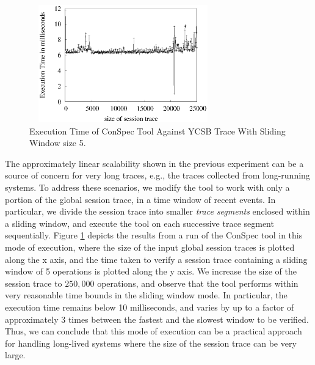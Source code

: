 \documentclass[journal, compsoc]{IEEEtran}
\begin{document}
\begin{figure}%
	\includegraphics[width=3.2in,height=2in]
	{conspecExecutionTimes.eps} %
	\caption{Execution Time of ConSpec Tool Against YCSB Trace With Sliding Window size 5.}
	\label{fig:exampleIter}
\end{figure}
	
	 \par The approximately linear scalability shown in the previous experiment can be a source of concern for very long traces, e.g., the traces collected from long-running systems. To address these scenarios, we modify the tool to work with only a portion of the global session trace, in a time window of recent events. In particular, we divide the session trace into smaller \emph{trace segments} enclosed within a sliding window, and execute  the tool on  each successive trace segment sequentially.   Figure \ref{fig:exampleIter} depicts the results from a run of the ConSpec tool in this mode of execution, where the size of the input global session traces is plotted along the x axis, and the time taken to verify a session trace containing a sliding window of 5 operations is plotted along the y axis. We increase the size of the session trace to $250,000$ operations, and observe that the tool performs within very reasonable time bounds in the sliding window mode. In particular, the execution time remains below %
	   10 milliseconds, and varies by up to a factor of approximately 3 times between the fastest and the slowest window to be verified.   Thus, we can conclude that this mode of execution can be a practical approach for handling long-lived systems where the size of the session trace can be very large.
\end{document}
